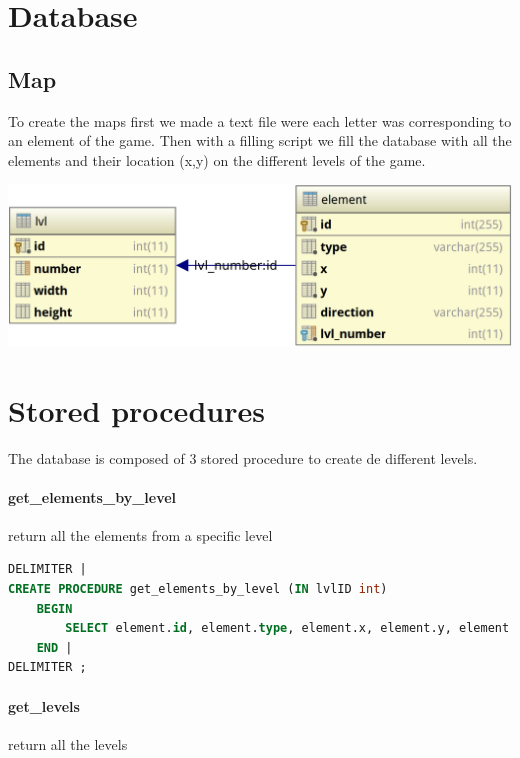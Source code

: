 \documentclass{report}
\begin{document}
\section{Database}

\subsection{Map}

To create the maps first we made a text file were each letter was corresponding to an element of the game. Then with a filling script we fill the database with all the elements and their location (x,y) on the different levels of the game.

\begin{center}
\includegraphics[scale=0.2]{resources/MPD.png}
\end{center}

\section{Stored procedures}

The database is composed of 3 stored procedure to create de different levels.

\paragraph{get\_elements\_by\_level} return all the elements from a specific level

\begin{lstlisting}[language=SQL]
DELIMITER |
CREATE PROCEDURE get_elements_by_level (IN lvlID int)
	BEGIN
		SELECT element.id, element.type, element.x, element.y, element.direction, element.lvl_number FROM element WHERE lvl_number = lvlID
	END |
DELIMITER ;
\end{lstlisting}

\paragraph{get\_levels} return all the levels
\end{document}
